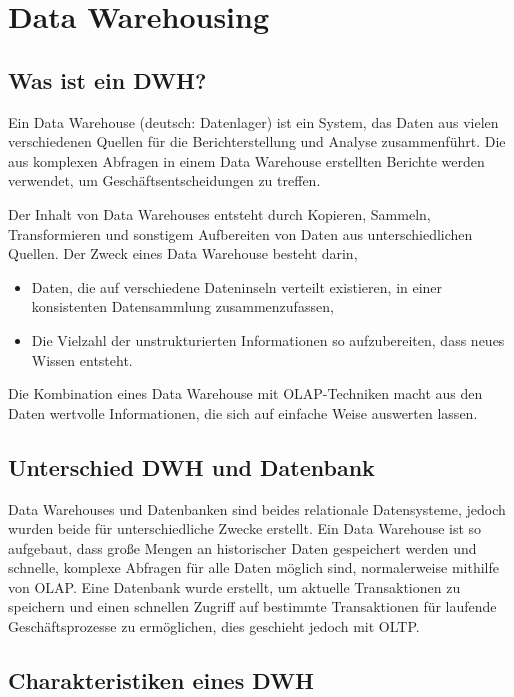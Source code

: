 \chapter{Data Warehousing}\label{cha:datawarehousing}

\section{Was ist ein DWH?}

Ein Data Warehouse (deutsch: Datenlager) ist ein System, das Daten aus vielen verschiedenen Quellen für die Berichterstellung und Analyse zusammenführt.
Die aus komplexen Abfragen in einem Data Warehouse erstellten Berichte werden verwendet, um Geschäftsentscheidungen zu treffen.

Der Inhalt von Data Warehouses entsteht durch Kopieren, Sammeln, Transformieren und sonstigem Aufbereiten von Daten aus unterschiedlichen Quellen.
Der Zweck eines Data Warehouse besteht darin,
\begin{itemize}
    \item Daten, die auf verschiedene Dateninseln verteilt existieren, in einer konsistenten Datensammlung zusammenzufassen,
    \item Die Vielzahl der unstrukturierten Informationen so aufzubereiten, dass neues Wissen entsteht.
\end{itemize}

Die Kombination eines Data Warehouse mit OLAP-Techniken macht aus den Daten wertvolle Informationen, die sich auf einfache Weise auswerten lassen.

\section{Unterschied DWH und Datenbank}

Data Warehouses und Datenbanken sind beides relationale Datensysteme, jedoch wurden beide für unterschiedliche Zwecke erstellt. Ein Data Warehouse ist so aufgebaut, dass große Mengen an historischer Daten gespeichert werden und schnelle, komplexe Abfragen für alle Daten möglich sind, normalerweise mithilfe von OLAP. Eine Datenbank wurde erstellt, um aktuelle Transaktionen zu speichern und einen schnellen Zugriff auf bestimmte Transaktionen für laufende Geschäftsprozesse zu ermöglichen, dies geschieht jedoch mit OLTP.

\section{Charakteristiken eines DWH}

